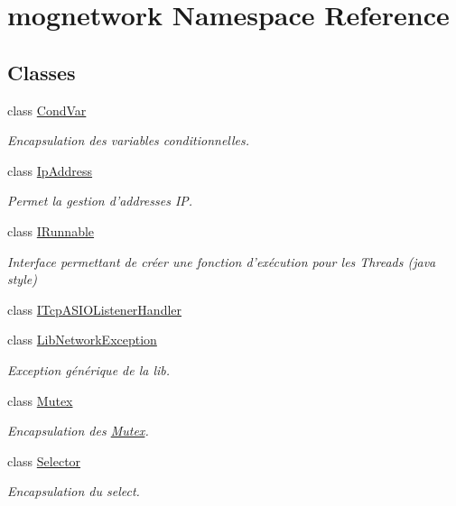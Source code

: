 \hypertarget{namespacemognetwork}{\section{mognetwork Namespace Reference}
\label{namespacemognetwork}
}
\subsection*{Classes}
\begin{DoxyCompactItemize}
\item 
class \hyperlink{classmognetwork_1_1_cond_var}{Cond\-Var}
\begin{DoxyCompactList}\small\item\em Encapsulation des variables conditionnelles. \end{DoxyCompactList}\item 
class \hyperlink{classmognetwork_1_1_ip_address}{Ip\-Address}
\begin{DoxyCompactList}\small\item\em Permet la gestion d'addresses I\-P. \end{DoxyCompactList}\item 
class \hyperlink{classmognetwork_1_1_i_runnable}{I\-Runnable}
\begin{DoxyCompactList}\small\item\em Interface permettant de créer une fonction d'exécution pour les Threads (java style) \end{DoxyCompactList}\item 
class \hyperlink{classmognetwork_1_1_i_tcp_a_s_i_o_listener_handler}{I\-Tcp\-A\-S\-I\-O\-Listener\-Handler}
\item 
class \hyperlink{classmognetwork_1_1_lib_network_exception}{Lib\-Network\-Exception}
\begin{DoxyCompactList}\small\item\em Exception générique de la lib. \end{DoxyCompactList}\item 
class \hyperlink{classmognetwork_1_1_mutex}{Mutex}
\begin{DoxyCompactList}\small\item\em Encapsulation des \hyperlink{classmognetwork_1_1_mutex}{Mutex}. \end{DoxyCompactList}\item 
class \hyperlink{classmognetwork_1_1_selector}{Selector}
\begin{DoxyCompactList}\small\item\em Encapsulation du select. \end{DoxyCompactList}\item 

\end{DoxyCompactItemize}
